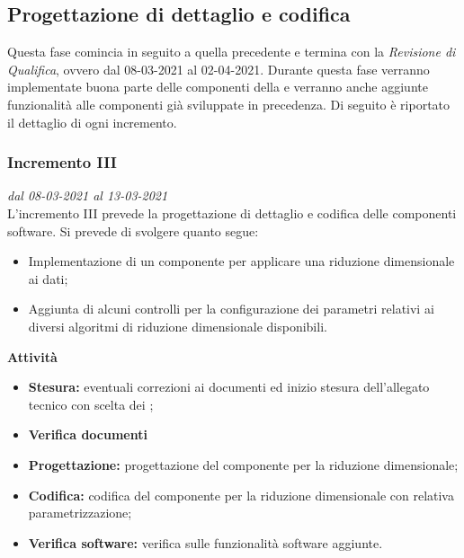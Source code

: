 \subsection{Progettazione di dettaglio e codifica}
Questa fase comincia in seguito a quella precedente e termina con la \textit{Revisione di Qualifica}, ovvero dal 08-03-2021 al 02-04-2021. Durante questa fase verranno implementate buona parte delle componenti della  e verranno anche aggiunte funzionalità alle componenti già sviluppate in precedenza.
Di seguito è riportato il dettaglio di ogni incremento.

\subsubsection{Incremento III}
\textit{dal 08-03-2021 al 13-03-2021}\\
L'incremento III prevede la progettazione di dettaglio e codifica delle componenti software. Si prevede di svolgere quanto segue:
\begin{itemize}
\item Implementazione di un componente per applicare una riduzione dimensionale ai dati;
\item Aggiunta di alcuni controlli per la configurazione dei parametri relativi ai diversi algoritmi di riduzione dimensionale disponibili.
\end{itemize}
\textbf{Attività}
\begin{itemize}
\item \textbf{Stesura:} eventuali correzioni ai documenti ed inizio stesura dell'allegato tecnico con scelta dei ;
\item \textbf{Verifica documenti}
\item \textbf{Progettazione:} progettazione del componente per la riduzione dimensionale;
\item \textbf{Codifica:} codifica del componente per la riduzione dimensionale con relativa parametrizzazione;
\item \textbf{Verifica software:} verifica sulle funzionalità software aggiunte.
\end{itemize}
